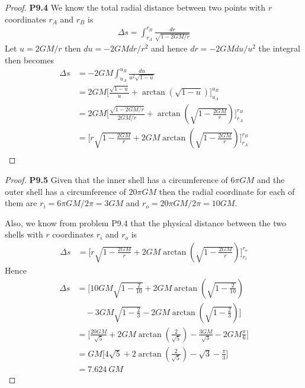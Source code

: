 \documentclass[11pt]{article}
\theoremstyle{definition}
\begin{document}
\cleardoublepage
\begin{proof}{\textbf{P9.4}}
    We know the total radial distance between two points with $r$ coordinates
    $r_A$ and $r_B$ is 
    \begin{align*}
        \Delta s = \int_{r_A}^{r_B} \frac{dr}{\sqrt{1 - 2GM/r}}
    \end{align*}
    Let $u = 2GM/r$ then $du = -2GM dr/r^2$ and hence $dr = -2GM du/u^2$
    the integral then becomes
    \begin{align*}
        \Delta s &= -2GM\int_{u_A}^{u_B} \frac{du}{u^2\sqrt{1 - u}}\\
            &= 2GM\bigg[\frac{\sqrt{1-u}}{u} + \arctan(\sqrt{1-u})\bigg]_{u_A}^{u_B}\\
            &= 2GM\bigg[\frac{\sqrt{1-2GM/r}}{2GM/r}
            + \arctan(\sqrt{1-\frac{2GM}{r}})\bigg]_{r_A}^{r_B}\\
            &= \bigg[r\sqrt{1-\frac{2GM}{r}}
            + 2GM\arctan(\sqrt{1-\frac{2GM}{r}})\bigg]_{r_A}^{r_B}\\
        \end{align*}
\end{proof}
\cleardoublepage
\begin{proof}{\textbf{P9.5}}
    Given that the inner shell has a circumference of $6\pi GM$ and the outer
    shell has a circumference of $20\pi GM$ then the radial coordinate
    for each of them are $r_i = 6\pi GM/2\pi = 3GM$ and
    $r_o = 20\pi GM / 2\pi = 10GM$.

    Also, we know from problem P9.4 that the physical distance between the two
    shells with $r$ coordinates $r_i$ and $r_o$ is 
    \begin{align*}
        \Delta s
        &= \bigg[r\sqrt{1-\frac{2GM}{r}}
        + 2GM\arctan(\sqrt{1-\frac{2GM}{r}})\bigg]_{r_i}^{r_o}
    \end{align*}
    Hence
    \begin{align*}
        \Delta s
        &= \bigg[
        10GM\sqrt{1-\frac{2}{10}}
        + 2GM\arctan(\sqrt{1-\frac{2}{10}})\\
        &\quad
        -3GM\sqrt{1-\frac{2}{3}}
        - 2GM\arctan(\sqrt{1-\frac{2}{3}})
        \bigg]\\
        &= \bigg[\frac{20GM}{\sqrt{5}} + 2GM\arctan(\frac{2}{\sqrt{5}})
        -\frac{3GM}{\sqrt{3}} - 2GM\frac{\pi}{6}\bigg]\\
        &= GM\bigg[4\sqrt{5} + 2\arctan(\frac{2}{\sqrt{5}})
        -\sqrt{3} - \frac{\pi}{3}\bigg]\\
        &= 7.624~GM
    \end{align*}
\end{proof}
\end{document}
